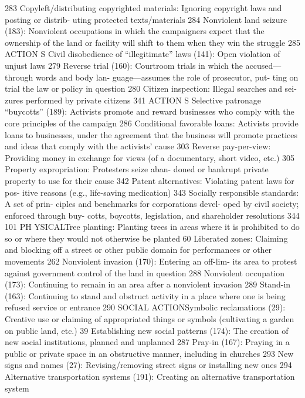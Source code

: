 \documentclass[twoside,a4paper,12pt,fleqn,openany]{extbook}
\begin{document}
 283
Copyleft/distributing copyrighted materials:
Ignoring copyright laws and posting or distrib-
uting protected texts/materials
 284
Nonviolent land seizure (183): Nonviolent
occupations in which the campaigners expect
that the ownership of the land or facility will
shift to them when they win the struggle 285
ACTION S
Civil disobedience of “illegitimate” laws (141):
Open violation of unjust laws
 279
Reverse trial (160): Courtroom trials in which
the accused—through words and body lan-
guage—assumes the role of prosecutor, put-
ting on trial the law or policy in question 280
Citizen inspection: Illegal searches and sei-
zures performed by private citizens
 341
ACTION S
Selective patronage “buycotts” (189): Activists
promote and reward businesses who comply
with the core principles of the campaign 286
Conditional favorable loans: Activists provide
loans to businesses, under the agreement that
the business will promote practices and ideas
that comply with the activists’ cause
 303
Reverse pay-per-view: Providing money in
exchange for views (of a documentary, short
video, etc.)
 305
Property expropriation: Protesters seize aban-
doned or bankrupt private property to use for
their cause
 342
Patent alternatives: Violating patent laws for pos-
itive reasons (e.g., life-saving medication) 343
Socially responsible standards: A set of prin-
ciples and benchmarks for corporations devel-
oped by civil society; enforced through buy-
cotts, boycotts, legislation, and shareholder
resolutions
 344
101
PH YSICALTree planting: Planting trees in areas where it
is prohibited to do so or where they would not
otherwise be planted
 60
Liberated zones: Claiming and blocking off a
street or other public domain for performances
or other movements
 262
Nonviolent invasion (170): Entering an off-lim-
its area to protest against government control
of the land in question
 288
Nonviolent occupation (173): Continuing to
remain in an area after a nonviolent invasion		
289
Stand-in (163): Continuing to stand and obstruct
activity in a place where one is being refused
service or entrance
 290
SOCIAL ACTIONSymbolic reclamations (29): Creative use or
claiming of appropriated things or symbols
(cultivating a garden on public land, etc.) 39
Establishing new social patterns (174): The
creation of new social institutions, planned and
unplanned
 287
Pray-in (167): Praying in a public or private
space in an obstructive manner, including in
churches
 293
New signs and names (27): Revising/removing
street signs or installing new ones
 294
Alternative transportation systems (191):
Creating an alternative transportation system
\end{document}
